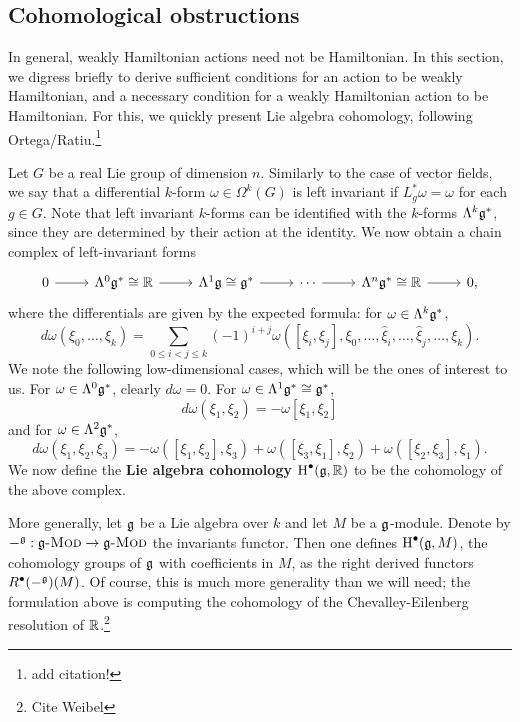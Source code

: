 \documentclass{amsart}
\begin{document}
\subsection{Cohomological obstructions}

In general, weakly Hamiltonian actions need not be Hamiltonian. 
In this section, we digress briefly to derive sufficient conditions for an action to be
weakly Hamiltonian, and a necessary condition for a weakly Hamiltonian action to be
Hamiltonian.
For this, we quickly present Lie algebra cohomology, following Ortega/Ratiu.\footnote{add citation!}

Let $G$ be a real Lie group of dimension $n$. Similarly to the case of vector fields, we say that a differential
$k$-form $\omega\in\Omega^k(G)$ is left invariant if $L_g^*\omega=\omega$ for each $g\in G$.
Note that left invariant $k$-forms can be identified with the $k$-forms $\Lambda^k\mathfrak g^*$,
since they are determined by their action at the identity. We now obtain a chain complex
of left-invariant forms
\begin{equation*}
    \begin{tikzcd}
        0\ar{r}& \Lambda^0\fr g^*\cong\R\ar{r}& \Lambda^1\fr g\cong\fr g^*\ar{r} & \cdots\ar{r} & \Lambda^n\fr g^*\cong\R\ar{r} & 0,
    \end{tikzcd}
\end{equation*}
where the differentials are given by the expected formula: for $\omega\in\Lambda^k\mathfrak g^*$,
\begin{equation*}
    d\omega(\xi_0,\ldots,\xi_k) = \sum_{0\leqslant i<j\leqslant k}(-1)^{i+j}\omega([\xi_i,\xi_j],\xi_0,\ldots,\hat\xi_i,\ldots,\hat\xi_j,\ldots,\xi_k).
\end{equation*}
We note the following low-dimensional cases, which will be the ones of interest to us.
For $\omega\in\Lambda^0\mathfrak g^*$, clearly $d\omega=0$. For $\omega\in\Lambda^1\mathfrak g^*\cong\mathfrak g^*$,
\begin{equation*}
    d\omega(\xi_1,\xi_2) = -\omega [\xi_1,\xi_2]
\end{equation*}
and for $\omega\in\Lambda^2\mathfrak g^*$,
\begin{equation*}
    d\omega(\xi_1,\xi_2,\xi_3)=-\omega([\xi_1,\xi_2],\xi_3) + \omega([\xi_3,\xi_1],\xi_2) + \omega([\xi_2,\xi_3],\xi_1).
\end{equation*}
We now define the \textbf{Lie algebra cohomology} $\operatorname{H}^\bullet(\mathfrak g,\mathbb{R})$ to be the cohomology of the above complex.

\begin{remark}
    More generally, let $\mathfrak g$ be a Lie algebra over $k$ and let $M$ be a $\mathfrak g$-module.
    Denote by $-^\mathfrak g:\mathfrak g\textsc{-Mod}\to\mathfrak g\textsc{-Mod}$ the invariants functor.
    Then one defines $\operatorname{H}^\bullet(\mathfrak g,M)$, the cohomology groups of $\mathfrak g$ with coefficients
    in $M$, as the right derived functors $R^\bullet(-^\mathfrak g)(M)$. Of course, this is much more
    generality than we will need; the formulation above is computing
    the cohomology of the Chevalley-Eilenberg resolution of $\mathbb{R}$.\footnote{Cite Weibel}
\end{remark}
\end{document}
